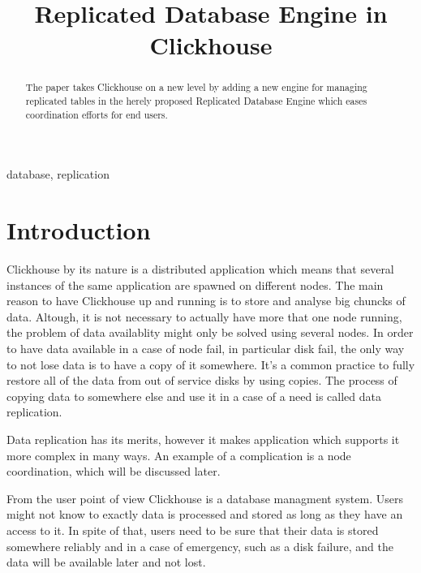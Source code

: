 \documentclass[conference]{IEEEtran}
\begin{document}
\title{Replicated Database Engine in Clickhouse
}

\author{
}

\maketitle

\begin{abstract}
The paper takes Clickhouse on a
new level by adding a new engine for managing replicated tables in the herely
proposed Replicated Database Engine which eases coordination efforts for end users.
\end{abstract}

\begin{IEEEkeywords}
database, replication
\end{IEEEkeywords}

\section{Introduction}

Clickhouse\cite{clickhousedocs} by its nature is a distributed application which means
that several instances of the same application are spawned
on different nodes. The main reason to have Clickhouse up and running is to
store and analyse big chuncks of data. Altough, it is not necessary to actually
have more that one node running, the problem of data availablity might only be solved
using several nodes. In order to have data available in a case of node fail,
in particular disk fail, the only way to not lose data is to have a copy of it
somewhere. It's a common practice to fully restore all of the data
from out of service disks by using copies. The process of copying
data to somewhere else and use it in a case of a need is called data replication.

Data replication has its merits, however it makes application which supports it more
complex in many ways.
An example of a complication is a node coordination, which will be discussed later.

From the user point of view Clickhouse is a database managment system.
Users might not know to exactly data is processed and stored as long as they have
an access to it.
In spite of that, users need to be sure that their data is stored somewhere
reliably and in a case of emergency, such as a disk failure, and the data will be
available later and not lost.
\end{document}
